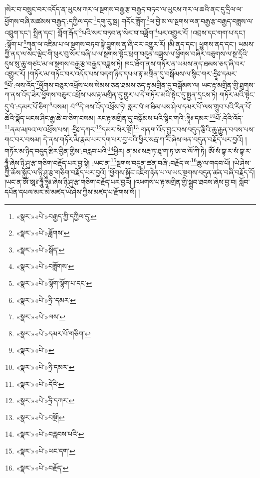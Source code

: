 །སེར་བ་བསྲུང་བར་འདོད་ན་ཡུངས་ཀར་ལ་སྔགས་བརྒྱ་རྩ་བརྒྱད་བཏབ་ལ་ཡུངས་ཀར་ལ་ཆའི་ནང་དུ་དྲིལ་ལ་ཕྱོགས་བཞི་མཚམས་བརྒྱད་:དཀྱིལ་དང་\footnote{«སྣར་»«པེ་»བརྒྱད་ཀྱི་དཀྱིལ་དུ་}དགུ་རུ་སྦ། གདོང་ཟློག་\footnote{«སྣར་»«པེ་»ཟློགས་}ལ་བྱེ་མ་ལ་སྔགས་ལན་བརྒྱ་རྩ་བརྒྱད་བཟླས་ལ་འབྲུག་དང་། སྤྲིན་དང་། གློག་རྒོད་\footnote{«སྣར་»«པེ་»སྒོད་}པའི་སར་བཏབ་ན་སེར་བ་བཟློག་\footnote{«སྣར་»«པེ་»བཟློགས་}པར་འགྱུར་རོ། །འབྲས་དང་གག་པ་དང་། :ལྷོག་པ་\footnote{«སྣར་»«པེ་»ལྷོག་ལྷོག་པ་དང་}ཀུན་ལ་འཇིམ་པ་ལ་སྔགས་བཏབ་སྟེ་བྱུགས་ན་ཞི་བར་འགྱུར་རོ། །མི་ནད་དང་། ཕྱུགས་ནད་དང་། ཡམས་ཀྱི་ནད་ལ་སེང་ལྡེང་གི་ཕུར་བུ་སོར་བཞི་པ་ལ་སྔགས་སྟོང་ཕྲག་བདུན་བཟླས་ལ་ཕྱོགས་བཞིར་བཅུགས་ལ་སྔ་དྲོའི་དུས་སུ་ཆུ་གཙང་མ་ལ་སྔགས་བརྒྱ་རྩ་བརྒྱད་བཟླས་ཏེ། ཁང་ཐོག་ནས་གཏོར་ན་ཡམས་ནད་ཐམས་ཅད་ཞི་བར་འགྱུར་རོ། །གཏོར་མ་གཏོང་བར་འདོད་པས་བདག་ཉིད་དཔལ་རྟ་མགྲིན་དུ་བསྒོམས་ལ་སྙིང་གར་:ཧྲཱིཿ་དམར་\footnote{«སྣར་»«པེ་»ཧྲི་་དམར་}པོ་:ལས་འོད་\footnote{«སྣར་»«པེ་»ལས་}ཕྱོགས་བཅུར་འཕྲོས་པས་སེམས་ཅན་ཐམས་ཅད་རྟ་མགྲིན་དུ་བསྒོམས་ལ། ཡང་རྟ་མགྲིན་གྱི་ཐུགས་ཀ་ནས་འོད་ཟེར་ཕྱོགས་བཅུར་འཕྲོས་པས་རྟ་མགྲིན་དུ་གྱུར་པ་དེ་གཏོར་མའི་སྟེང་དུ་སྤྱན་དྲངས་ཏེ། གཏོར་མའི་སྟེང་དུ་བཾ་:དམར་པོ་ཅིག་\footnote{«སྣར་»«པེ་»དམར་པོ་གཅིག་}བསམ། བཾ་\footnote{«སྣར་»«པེ་»}དེ་ལས་འོད་འཕྲོས་ཏེ། སླར་བཾ་ལ་ཐིམ་པས་ཤེལ་དམར་པོ་ལས་གྲུབ་པའི་རིན་པོ་ཆེའི་སྣོད་ཡངས་ཤིང་རྒྱ་ཆེ་བ་ཅིག་བསམ། རང་རྟ་མགྲིན་དུ་བསྒོམས་པའི་སྙིང་གའི་:ཧྲཱིཿ་དམར་\footnote{«སྣར་»«པེ་»ཧྲི་དམར་}པོ་:དེའི་འོད་\footnote{«སྣར་»«པེ་»དེའི་}ནམ་མཁའ་ལ་འཕྲོས་པས། :ཧྲཱིཿ་དཀར་\footnote{«སྣར་»«པེ་»ཧྲི་དཀར་}དམར་སེར་སྔོ།\footnote{«སྣར་»«པེ་»བསྔོ།} གནག་འོད་བྱུང་བས་བདུད་རྩིའི་ཆུ་རྒྱུན་བབས་པས་གང་བར་བསམ། དེ་ནས་གཏོར་མ་རྣམ་པར་དག་པར་བྱ་བའི་ཕྱིར་སརྦ་ཀ་རི་ཞེས་ལན་བདུན་བརྗོད་པར་བྱའོ། །གཏོར་མ་ཉིད་བདུད་རྩིར་བྱིན་གྱིས་:བརླབ་པའི་\footnote{«སྣར་»«པེ་»བརླབས་པའི་}ཕྱིར། ན་མཿ་སརྦ་ཏ་ཐཱ་ག་ཏ་ཨ་བ་ལོ་ཀི་ཏེ། ཨོཾ་སཾ་བྷ་ར་སཾ་བྷ་ར་ཧཱུྃ་ཞེས་ཉི་ཤུ་རྩ་གཅིག་བརྗོད་པར་བྱ་སྟེ། :ཡང་ན་\footnote{«སྣར་»«པེ་»ཡང་དག་}སྔགས་བདུན་ཚན་བཞི་:བརྗོད་ལ་\footnote{«སྣར་»«པེ་»བརྗོད་}ཆུ་ལ་གདབ་པོ། །ཡེ་ཤེས་ཀྱི་ཆོས་སྐྱོང་ལ་ཉི་ཤུ་རྩ་གཅིག་བརྗོད་པར་བྱའོ། །ཕྱོགས་སྐྱོང་འཇིག་རྟེན་པ་ལ་ཡང་སྔགས་བདུན་ཚན་བཞི་བརྗོད་དོ། །ཡང་ན་ཨོཾ་ཨཱཿ་ཧཱུྃ་ཧྲཱིཿ་ཞེས་ཉི་ཤུ་རྩ་གཅིག་བརྗོད་པར་བྱའོ། །འཕགས་པ་རྟ་མགྲིན་གྱི་སྒྲུབ་ཐབས་ཞེས་བྱ་བ། སློབ་དཔོན་དཔལ་མར་མེ་མཛད་ཡེ་ཤེས་ཀྱིས་མཛད་པ་རྫོགས་སོ། ། 